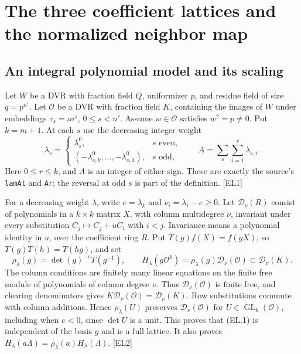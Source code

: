 \section{The three coefficient lattices and the normalized neighbor map}
\label{sec:edge-lattices}


\subsection{An integral polynomial model and its scaling}

Let $W$ be a DVR with fraction field $Q$, uniformizer $p$, and residue field of size $q=p^{n'}$. Let $\mathcal O$ be a DVR with fraction field $K$, containing the images of $W$ under embeddings $\tau_s=\iota\sigma^s$, $0\le s<n'$. Assume $w\in\mathcal O$ satisfies $w^2=p\ne0$. Put $k=m+1$. At each $s$ use the decreasing integer weight
\[
 \lambda_s=
 \begin{cases}
   \lambda^0_s,&s\text{ even},\\
   (-\lambda^0_{s,k},\ldots,-\lambda^0_{s,1}),&s\text{ odd},
 \end{cases}
 \qquad
 A=\sum_s\sum_{i=1}^{r}\lambda_{s,i}.
\]
Here $0\le r\le k$, and $A$ is an integer of either sign. These are exactly the source's \texttt{lamAt} and \texttt{Ar}; the reversal at odd $s$ is part of the definition. \textsf{[EL1]}

For a decreasing weight $\lambda$, write $e=\lambda_k$ and $\nu_i=\lambda_i-e\ge0$. Let $\mathcal D_\nu(R)$ consist of polynomials in a $k\times k$ matrix $X$, with column multidegree $\nu$, invariant under every substitution
$C_j\mapsto C_j+uC_i$ with $i<j$. Invariance means a polynomial identity in $u$, over the coefficient ring $R$. Put $T(g)f(X)=f(gX)$, so $T(g)T(h)=T(hg)$, and set
\[
 \rho_\lambda(g)=\det(g)^{-e}T(g^{-1}),\qquad
 H_\lambda(g\mathcal O^k)=\rho_\lambda(g)\mathcal D_\nu(\mathcal O)
 \subset \mathcal D_\nu(K).
 \tag{EL.1}
\]
The column conditions are finitely many linear equations on the finite free module of polynomials of column degree $\nu$. Thus $\mathcal D_\nu(\mathcal O)$ is finite free, and clearing denominators gives
$K\mathcal D_\nu(\mathcal O)=\mathcal D_\nu(K)$.
Row substitutions commute with column additions. Hence $\rho_\lambda(U)$ preserves $\mathcal D_\nu(\mathcal O)$ for $U\in\operatorname{GL}_k(\mathcal O)$, including when $e<0$, since $\det U$ is a unit. This proves that (EL.1) is independent of the basis $g$ and is a full lattice. It also proves
$H_\lambda(a\Lambda)=\rho_\lambda(a)H_\lambda(\Lambda)$.
\textsf{[EL2]}

